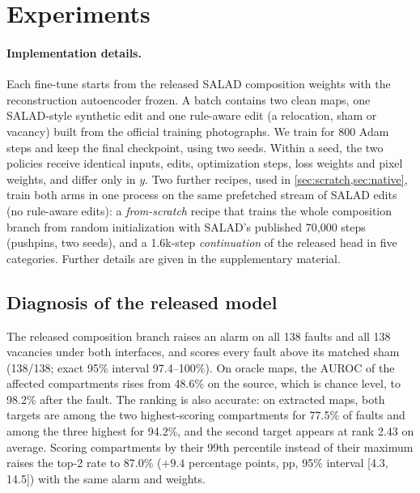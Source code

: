 \section{Experiments}
\label{sec:results}
\paragraph{Implementation details.}
Each fine-tune starts from the released SALAD composition weights with the reconstruction autoencoder frozen. A batch contains two clean maps, one SALAD-style synthetic edit and one rule-aware edit (a relocation, sham or vacancy) built from the official training photographs. We train for 800 Adam steps and keep the final checkpoint, using two seeds. Within a seed, the two policies receive identical inputs, edits, optimization steps, loss weights and pixel weights, and differ only in $y$. Two further recipes, used in \cref{sec:scratch,sec:native}, train both arms in one process on the same prefetched stream of SALAD edits (no rule-aware edits): a \emph{from-scratch} recipe that trains the whole composition branch from random initialization with SALAD's published 70{,}000 steps (pushpins, two seeds), and a 1.6k-step \emph{continuation} of the released head in five categories. Further details are given in the supplementary material.

\subsection{Diagnosis of the released model}
\label{sec:released}
The released composition branch raises an alarm on all 138 faults and all 138 vacancies under both interfaces, and scores every fault above its matched sham (138/138; exact 95\% interval 97.4--100\%). On oracle maps, the AUROC of the affected compartments rises from 48.6\% on the source, which is chance level, to 98.2\% after the fault. The ranking is also accurate: on extracted maps, both targets are among the two highest-scoring compartments for 77.5\% of faults and among the three highest for 94.2\%, and the second target appears at rank 2.43 on average. Scoring compartments by their 99th percentile instead of their maximum raises the top-2 rate to 87.0\% ($+9.4$ percentage points, pp, 95\% interval [4.3, 14.5]) with the same alarm and weights.

